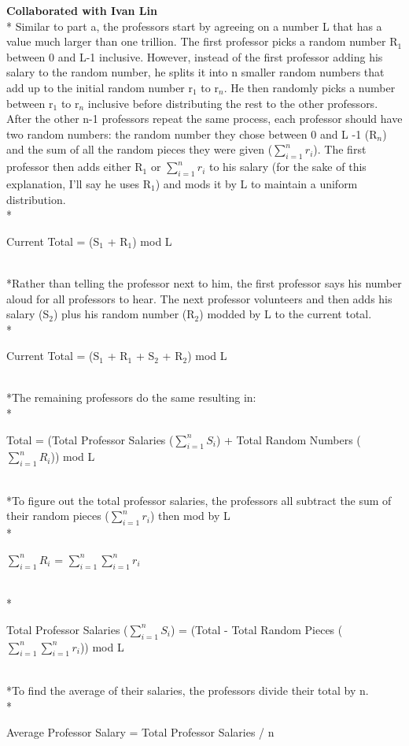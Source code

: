 \documentclass{article}
\begin{document}
\noindent
\textbf{Collaborated with Ivan Lin}
\\* Similar to part a, the professors start by agreeing on a number L that has a value much larger than one trillion. The first professor picks a random number R$_1$ between 0 and L-1 inclusive. However, instead of the first professor adding his salary to the random number, he splits it into n smaller random numbers that add up to the initial random number r$_1$ to r$_n$. He then randomly picks a number between r$_1$ to r$_n$ inclusive before distributing the rest to the other professors. After the other n-1 professors repeat the same process, each professor should have two random numbers: the random number they chose between 0 and L -1 (R$_n$) and the sum of all the random pieces they were given ($\sum_{i=1}^{n} r_{i}$). 
The first professor then adds either R$_1$ or $\sum_{i=1}^{n} r_{i}$ to his salary (for the sake of this explanation, I'll say he uses R$_1$) and mods it by L to maintain a uniform distribution. 
\smallskip
\\*\centerline{Current Total = (S$_1$ + R$_1$) mod L}
\smallskip 
\\*Rather than telling the professor next to him, the first professor says his number aloud for all professors to hear. The next professor volunteers and then adds his salary (S$_2$) plus his random number (R$_2$) modded by L to the current total.
\\*\centerline{Current Total = (S$_1$ + R$_1$ + S$_2$ + R$_2$) mod L}
\smallskip
\\*The remaining professors do the same resulting in:
\smallskip
\\*\centerline{Total = (Total Professor Salaries ($\sum_{i=1}^{n} S_{i}$) + Total Random Numbers ($\sum_{i=1}^{n} R_{i}$)) mod L}
\smallskip
\\*To figure out the total professor salaries, the professors all subtract the sum of their random pieces ($\sum_{i=1}^{n} r_{i}$) then mod by L
\\*\centerline{$\sum_{i=1}^{n} R_{i}$ = $\sum_{i=1}^{n}\sum_{i=1}^{n} r_{i}$}
\smallskip
\\*\centerline{Total Professor Salaries ($\sum_{i=1}^{n} S_{i}$) = (Total - Total Random Pieces ($\sum_{i=1}^{n}\sum_{i=1}^{n} r_{i}$)) mod L}
\smallskip
\\*To find the average of their salaries, the professors divide their total by n.
\smallskip
\\*\centerline{Average Professor Salary = Total Professor Salaries / n}
\end{document}
